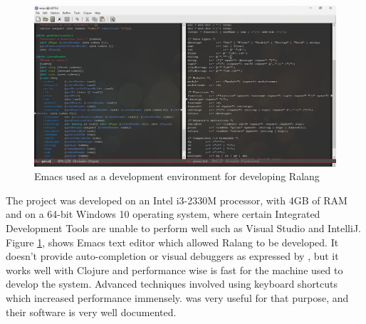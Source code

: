 \documentclass[a4paper]{article}
\begin{document}
	\begin{figure}[h!]
		\centering
		\includegraphics[width=\linewidth]{images/development_environment.png}
		\caption{Emacs used as a development environment for developing Ralang}
		\label{fig:development_environment}
	\end{figure}
	The project was developed on an Intel i3-2330M processor, with 4GB of RAM and on a 64-bit Windows 10 operating system, where certain Integrated Development Tools are unable to perform well such as Visual Studio and IntelliJ. Figure \ref{fig:development_environment}, shows Emacs text editor which allowed Ralang to be developed. It doesn't provide auto-completion or visual debuggers as expressed by \textcite{WhyEmacs}, but it works well with Clojure and performance wise is fast for the machine used to develop the system. Advanced techniques involved using keyboard shortcuts which increased performance immensely. \textcite{EmacsManual} was very useful for that purpose, and their software is very well documented.\\
	
\end{document}
